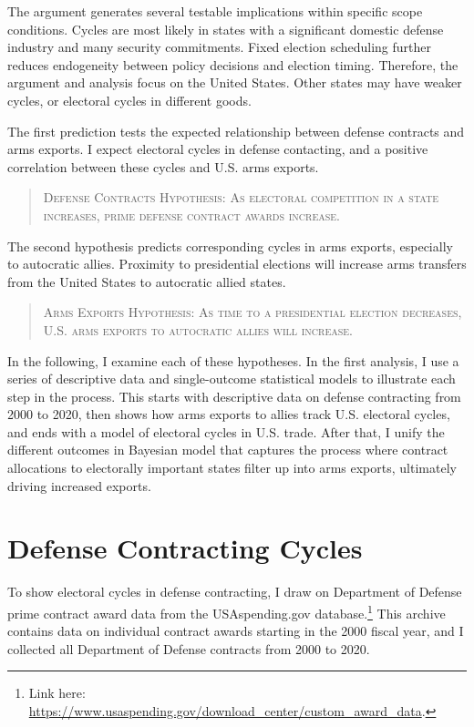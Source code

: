 \documentclass[12pt]{article}
\begin{document}
The argument generates several testable implications within specific scope conditions. 
Cycles are most likely in states with a significant domestic defense industry and many security commitments.
Fixed election scheduling further reduces endogeneity between policy decisions and election timing.
Therefore, the argument and analysis focus on the United States. 
Other states may have weaker cycles, or electoral cycles in different goods.


The first prediction tests the expected relationship between defense contracts and arms exports. 
I expect electoral cycles in defense contacting, and a positive correlation between these cycles and U.S. arms exports.


\begin{quote}
\textsc{Defense Contracts Hypothesis: As electoral competition in a state increases, prime defense contract awards increase.}
\end{quote}


The second hypothesis predicts corresponding cycles in arms exports, especially to autocratic allies.
Proximity to presidential elections will increase arms transfers from the United States to autocratic allied states. 


\begin{quote}
\textsc{Arms Exports Hypothesis: As time to a presidential election decreases, U.S. arms exports to autocratic allies will increase.}
\end{quote}




In the following, I examine each of these hypotheses. 
In the first analysis, I use a series of descriptive data and single-outcome statistical models to illustrate each step in the process.
This starts with descriptive data on defense contracting from 2000 to 2020, then shows how arms exports to allies track U.S. electoral cycles, and ends with a model of electoral cycles in U.S. trade. 
After that, I unify the different outcomes in Bayesian model that captures the process where contract allocations to electorally important states filter up into arms exports, ultimately driving increased exports.


\section{Defense Contracting Cycles}


To show electoral cycles in defense contracting, I draw on Department of Defense prime contract award data from the USAspending.gov database.\footnote{Link here: \url{https://www.usaspending.gov/download_center/custom_award_data}.} 
This archive contains data on individual contract awards starting in the 2000 fiscal year, and I collected all Department of Defense contracts from 2000 to 2020.
\end{document}
